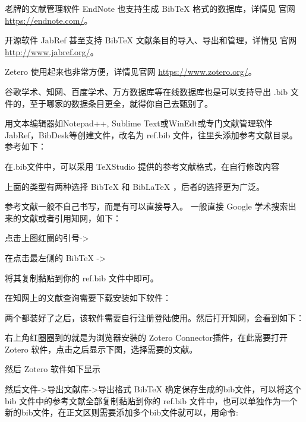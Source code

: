 老牌的文献管理软件
EndNote 也支持生成 BibTeX 格式的数据库，详情见
官网\url{https://endnote.com/}。 

开源软件 JabRef 甚至支持 BibTeX
文献条目的导入、导出和管理，详情见 官网\url{http://www.jabref.org/}。

Zetero 使用起来也非常方便，详情见官网 \url{https://www.zotero.org/}。

谷歌学术、知网、百度学术、万方数据库等在线数据库也是可以支持导出 .bib
文件的，至于哪家的数据条目更全，就得你自己去甄别了。



用文本编辑器如Notepad++, Sublime
Text或WinEdt或专门文献管理软件JabRef，BibDesk等创建文件，改名为 ref.bib
文件，往里头添加参考文献目录。参考如下：

在.bib文件中，可以采用 TeXStudio 提供的参考文献格式，在自行修改内容

上面的类型有两种选择 BibTeX 和 BibLaTeX ，后者的选择更为广泛。

参考文献一般不自己书写，而是有可以直接导入。 一般直接 Google 学术搜索出来的文献或者引用知网，如下：

点击上图红圈的引号-\textgreater{}

在点击最左侧的 BibTeX -\textgreater{}

将其复制黏贴到你的 ref.bib 文件中即可。

在知网上的文献查询需要下载安装如下软件：

两个都装好了之后，该软件需要自行注册登陆使用。然后打开知网，会看到如下：

右上角红圈圈到的就是为浏览器安装的 Zotero Connector插件，在此需要打开 Zotero 软件，点击之后显示下图，选择需要的文献。

然后 Zotero 软件如下显示

然后文件-\textgreater{}导出文献库-\textgreater{}导出格式 BibTeX 确定保存生成的bib文件，可以将这个 bib 文件中的参考文献全部复制黏贴到你的 ref.bib 文件中，也可以单独作为一个新的bib文件，在正文区则需要添加多个bib文件就可以，用命令:

